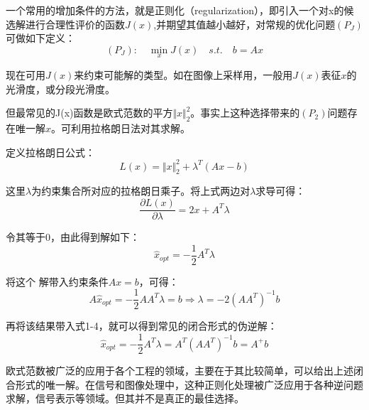 一个常用的增加条件的方法，就是正则化（regularization），即引入一个对x的候选解进行合理性评价的函数$J(x)$,并期望其值越小越好，对常规的优化问题$(P_J)$可做如下定义：
\begin{equation}
	(P_J):\quad  \min_{x}J(x)\quad s.t.\quad b=Ax
\end{equation}
\par 现在可用$J(x)$来约束可能解的类型。如在图像上采样用，一般用$J(x)$表征$x$的光滑度，或分段光滑度。

但最常见的J(x)函数是欧式范数的平方$\Vert{x}\Vert^2_2$。事实上这种选择带来的$(P_2)$问题存在唯一解$\hat{x}$。可利用拉格朗日法对其求解。

定义拉格朗日公式：
\begin{equation}%
L(x)= \Vert x \Vert_2^2 + \lambda^{T}(Ax-b)
\end{equation}

这里$\lambda$为约束集合所对应的拉格朗日乘子。将上式两边对$ \lambda $求导可得：
\begin{equation}\label{key}
\frac{\partial L(x)}{\partial\lambda}= 2 x  +A^{T}\lambda 
\end{equation}

令其等于0，由此得到解如下：
\begin{equation}\label{key}
\hat{x}_{opt} = -\frac{1}{2} A^T \lambda
\end{equation}

将这个 解带入约束条件$ Ax=b $，可得：
\begin{equation}\label{key}
A\hat{x}_{opt} = -\frac{1}{2} A A^T \lambda = b  \Longrightarrow
 \lambda = -2(AA^T)^{-1}b 
\end{equation}

再将该结果带入式1-4，就可以得到常见的闭合形式的伪逆解：
\begin{equation}\label{key}
\hat{x}_{opt} = -\frac{1}{2} A^T \lambda = A^{T}(AA^T)^{-1}b  = A^{+}b
\end{equation}


欧式范数被广泛的应用于各个工程的领域，主要在于其比较简单，可以给出上述闭合形式的唯一解。在信号和图像处理中，这种正则化处理被广泛应用于各种逆问题求解，信号表示等领域。但其并不是真正的最佳选择。





































